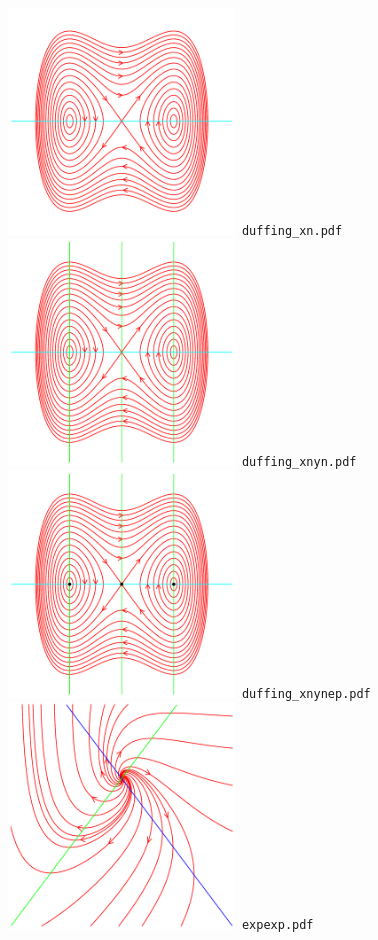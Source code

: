 \documentclass[a4paper]{amsart}
\begin{document}
\includegraphics[width=6cm]{duffing_xn.pdf}\verb+ duffing_xn.pdf+\\
\includegraphics[width=6cm]{duffing_xnyn.pdf}\verb+ duffing_xnyn.pdf+\\
\includegraphics[width=6cm]{duffing_xnynep.pdf}\verb+ duffing_xnynep.pdf+\\
\includegraphics[width=6cm]{expexp.pdf}\verb+ expexp.pdf+\\
\end{document}
